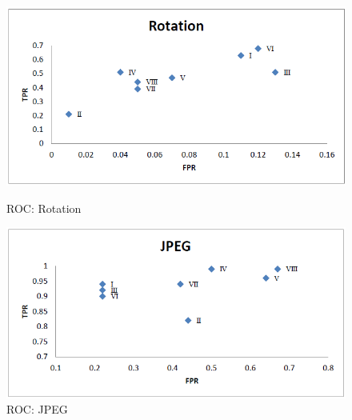 \documentclass[12pt,a4paper]{jihmsp}
\begin{document}
{{\begin{figure}[h]
	\begin{multicols}{2}
		\includegraphics[width=\linewidth]{5rotation.png}\par\caption{ROC: Rotation}
		\includegraphics[width=\linewidth]{6jpeg.png}\par\caption{ROC: JPEG}
		
	\end{multicols}
\end{figure}

}}
\end{document}
